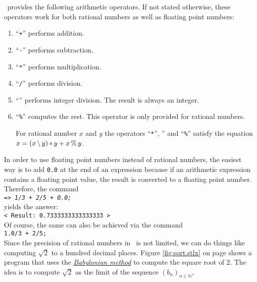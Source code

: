\setlx\ provides the following arithmetic operators.  If not stated otherwise, these operators work
for both rational numbers as well as floating point numbers:
\begin{enumerate}
\item ``\texttt{+}'' performs addition.
\item ``\texttt{-}'' performs subtraction.
\item ``\texttt{*}'' performs multiplication.
\item ``\texttt{/}'' performs division.
\item ``\texttt{}'' performs integer division.
      The result is always an integer.
\item ``\texttt{\%}'' computes the rest.  This operator is only provided for rational numbers.

      For rational number $x$ and $y$ the operators ``\texttt{*}'', \texttt{}'' and ``\texttt{\%}'' 
      satisfy the equation
      \\[0.2cm]
      \hspace*{1.3cm}
      $x = (x \,\mathtt{\symbol{92}}\, y) \,\mathtt{*}\, y + x\,\mathtt{\%}\, y$.
\end{enumerate}
In order to use floating point numbers instead of rational numbers, the easiest way is to add
\texttt{0.0} at the end of an expression because if an arithmetic expression 
contains a floating point value, the result is converted to a floating point number.
Therefore, the command
\\[0.2cm]
\hspace*{1.3cm}
\texttt{=> \textsl{1/3 + 2/5 + 0.0;}}
\\[0.2cm]
yields the answer:
\\[0.2cm]
\hspace*{1.3cm}
\texttt{< Result: 0.7333333333333333 >}
\\[0.2cm]
Of course, the same can also be achieved via the command
\\[0.2cm]
\hspace*{1.3cm}
\texttt{1.0/3 + 2/5;}
\\[0.2cm]
Since the precision of rational numbers in \setlx\ is not limited, we can do things like computing
$\sqrt{2}$ to a hundred decimal places.  Figure \ref{fig:sqrt.stlx} on page \pageref{fig:sqrt.stlx}
shows a program that uses the 
\href{http://en.wikipedia.org/wiki/Methods_of_computing_square_roots#Babylonian_method}{\emph{Babylonian method}}
to compute the square root of $2$.  The idea is to compute $\sqrt{2}$ as the limit of the sequence $(b_n)_{n\in\mathbb{N}}$, 
